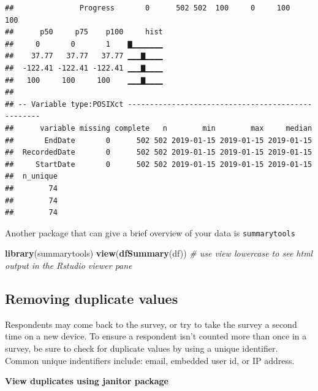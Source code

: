 \documentclass[]{book}
\newenvironment{Shaded}{\begin{snugshade}}{\end{snugshade}}
\newcommand{\CommentTok}[1]{\textcolor[rgb]{0.56,0.35,0.01}{\textit{#1}}}
\newcommand{\KeywordTok}[1]{\textcolor[rgb]{0.13,0.29,0.53}{\textbf{#1}}}
\newcommand{\NormalTok}[1]{#1}
\begin{document}
\begin{verbatim}
##               Progress       0      502 502  100     0     100     100   
##      p50     p75    p100     hist
##     0       0       1    ▇▁▁▁▁▁▁▁
##    37.77   37.77   37.77 ▁▁▁▇▁▁▁▁
##  -122.41 -122.41 -122.41 ▁▁▁▇▁▁▁▁
##   100     100     100    ▁▁▁▇▁▁▁▁
## 
## -- Variable type:POSIXct --------------------------------------------------
##      variable missing complete   n        min        max     median
##       EndDate       0      502 502 2019-01-15 2019-01-15 2019-01-15
##  RecordedDate       0      502 502 2019-01-15 2019-01-15 2019-01-15
##     StartDate       0      502 502 2019-01-15 2019-01-15 2019-01-15
##  n_unique
##        74
##        74
##        74
\end{verbatim}

Another package that can give a brief overview of your data is \texttt{summarytools}

\begin{Shaded}
\begin{Highlighting}[]
\KeywordTok{library}\NormalTok{(summarytools)}
\KeywordTok{view}\NormalTok{(}\KeywordTok{dfSummary}\NormalTok{(df)) }\CommentTok{# use view lowercase to see html output in the Rstudio viewer pane}
\end{Highlighting}
\end{Shaded}

\hypertarget{removing-duplicate-values}{%
\subsection{Removing duplicate values}\label{removing-duplicate-values}}

Respondents may come back to the survey, or try to take the survey a second time on a new device. To ensure a respondent isn't counted more than once in a survey, be sure to check for duplicate values by using a unique identifier. Common unique indentifiers include: email, embedded user id, or IP address.

\textbf{View duplicates using janitor package}
\end{document}
